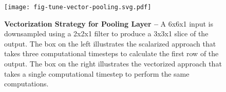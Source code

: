 
\begin{figure}[t]

  \centering
  \texttt{[image: fig-tune-vector-pooling.svg.pdf]}

  \caption{\textbf{Vectorization Strategy for Pooling Layer --} A 6x6x1
    input is downsampled using a 2x2x1 filter to produce a 3x3x1 slice of
    the output. The box on the left illustrates the scalarized approach
    that takes three computational timesteps to calculate the first row
    of the output. The box on the right illustrates the vectorized
    approach that takes a single computational timestep to perform the
    same computations.}

  \label{fig-tuning-vectorization-pooling}

\end{figure}
